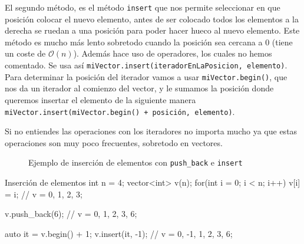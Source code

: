 \documentclass{article}
\begin{document}
    El segundo método, es el método \texttt{insert} que nos permite seleccionar en que posición colocar el
    nuevo elemento, antes de ser colocado todos los elementos a la derecha se ruedan a una posición para poder hacer hueco
    al nuevo elemento. Este método es mucho más lento sobretodo cuando la posición sea cercana a 0 (tiene un coste de $\mathcal{O}(n)$). 
    Además hace uso de operadores, los cuales no hemos comentado. Se usa así \texttt{miVector.insert(iteradorEnLaPosicion, elemento)}. 
    Para determinar la posición del iterador vamos a usar \texttt{miVector.begin()}, que nos da un iterador al comienzo del vector, 
    y le sumamos la posición donde queremos insertar el elemento de la siguiente manera \texttt{miVector.insert(miVector.begin() + posición, elemento)}.
    
    Si no entiendes las operaciones con los iteradores no importa mucho ya que estas operaciones son muy poco frecuentes, sobretodo en vectores.
    \begin{figure}[h]
        \centering
        \caption{Ejemplo de inserción de elementos con \texttt{push\_back} e \texttt{insert}}
    \end{figure}

    \begin{codelisting}{Inserción de elementos}
int n = 4;        
vector<int> v(n);
for(int i = 0; i < n; i++) {
    v[i] = i;
}
// v = {0, 1, 2, 3};

v.push_back(6); // v = {0, 1, 2, 3, 6};

auto it = v.begin() + 1;
v.insert(it, -1); // v = {0, -1, 1, 2, 3, 6};
        \end{codelisting}
\end{document}
